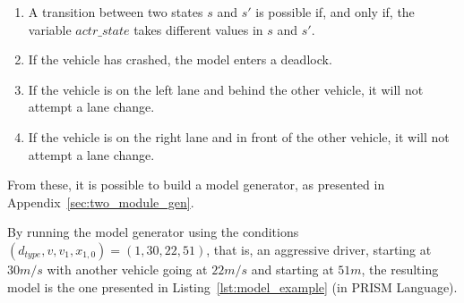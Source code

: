 \begin{enumerate}
	\item A transition between two states $s$ and $s'$ is possible if, and only if, the variable $actr\_state$ takes different values in $s$ and $s'$.
	\item If the vehicle has crashed, the model enters a deadlock.
	\item If the vehicle is on the left lane and behind the other vehicle, it will not attempt a lane change.
	\item If the vehicle is on the right lane and in front of the other vehicle, it will not attempt a lane change.
\end{enumerate}

From these, it is possible to build a model generator, as presented in Appendix~\ref{sec:two_module_gen}. 

By running the model generator using the conditions $(d_{type}, v, v_1, x_{1,0}) = (1,30,22,51)$, that is, an aggressive driver, starting at $30m/s$ with another vehicle going at $22m/s$ and starting at $51m$, the resulting model is the one presented in Listing~\ref{lst:model_example} (in PRISM Language).

